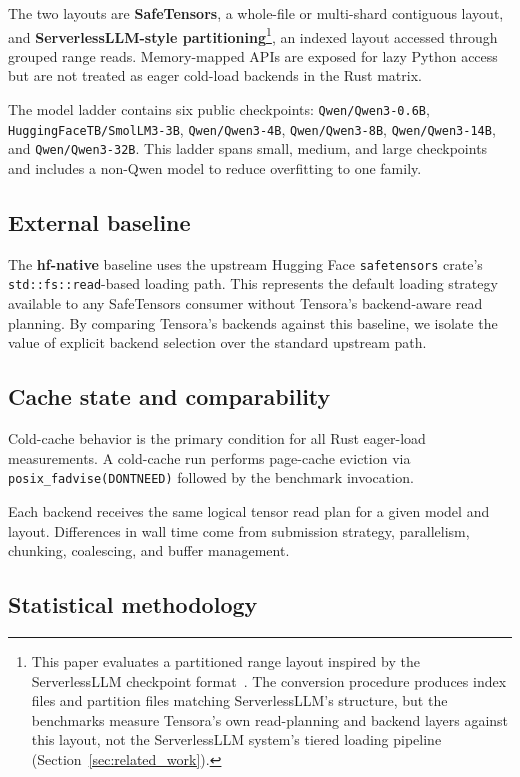 The two layouts are \textbf{SafeTensors}, a whole-file or multi-shard contiguous layout, and \textbf{ServerlessLLM-style partitioning}\footnote{This paper evaluates a partitioned range layout inspired by the ServerlessLLM checkpoint format~\cite{serverlessllm_repo}. The conversion procedure produces index files and partition files matching ServerlessLLM's structure, but the benchmarks measure Tensora's own read-planning and backend layers against this layout, not the ServerlessLLM system's tiered loading pipeline (Section~\ref{sec:related_work}).}, an indexed layout accessed through grouped range reads. Memory-mapped APIs are exposed for lazy Python access but are not treated as eager cold-load backends in the Rust matrix.

The model ladder contains six public checkpoints: \texttt{Qwen/Qwen3-0.6B}, \texttt{HuggingFaceTB/SmolLM3-3B}, \texttt{Qwen/Qwen3-4B}, \texttt{Qwen/Qwen3-8B}, \texttt{Qwen/Qwen3-14B}, and \texttt{Qwen/Qwen3-32B}. This ladder spans small, medium, and large checkpoints and includes a non-Qwen model to reduce overfitting to one family.

\subsection{External baseline}

The \textbf{hf-native} baseline uses the upstream Hugging Face \texttt{safetensors} crate's \texttt{std::fs::read}-based loading path. This represents the default loading strategy available to any SafeTensors consumer without Tensora's backend-aware read planning. By comparing Tensora's backends against this baseline, we isolate the value of explicit backend selection over the standard upstream path.

\subsection{Cache state and comparability}

Cold-cache behavior is the primary condition for all Rust eager-load measurements. A cold-cache run performs page-cache eviction via \texttt{posix\_fadvise(DONTNEED)} followed by the benchmark invocation.

Each backend receives the same logical tensor read plan for a given model and layout. Differences in wall time come from submission strategy, parallelism, chunking, coalescing, and buffer management.

\subsection{Statistical methodology}
\label{sec:baselines-reporting}

